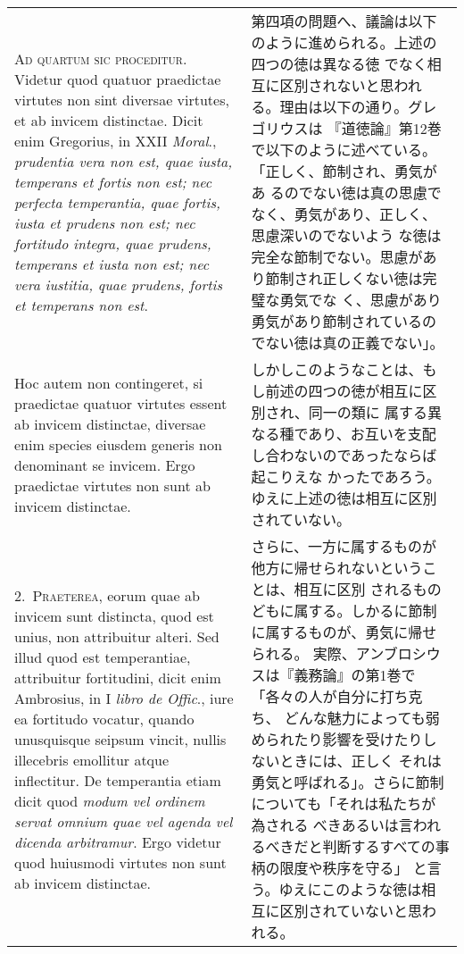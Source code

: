 \documentclass[10pt]{jsarticle}
\begin{document}
\begin{longtable}{p{21em}p{21em}}
{\scshape Ad quartum sic proceditur}. Videtur quod quatuor praedictae
virtutes non sint diversae virtutes, et ab invicem distinctae. Dicit
enim Gregorius, in XXII {\itshape Moral}., {\itshape prudentia vera
non est, quae iusta, temperans et fortis non est; nec perfecta
temperantia, quae fortis, iusta et prudens non est; nec fortitudo
integra, quae prudens, temperans et iusta non est; nec vera iustitia,
quae prudens, fortis et temperans non est}.


&

第四項の問題へ、議論は以下のように進められる。上述の四つの徳は異なる徳
でなく相互に区別されないと思われる。理由は以下の通り。グレゴリウスは
『道徳論』第12巻で以下のように述べている。「正しく、節制され、勇気があ
るのでない徳は真の思慮でなく、勇気があり、正しく、思慮深いのでないよう
な徳は完全な節制でない。思慮があり節制され正しくない徳は完璧な勇気でな
く、思慮があり勇気があり節制されているのでない徳は真の正義でない」。
 
\\


 Hoc autem non contingeret,
si praedictae quatuor virtutes essent ab invicem distinctae, diversae
enim species eiusdem generis non denominant se invicem. Ergo
praedictae virtutes non sunt ab invicem distinctae.


&

しかしこのようなことは、もし前述の四つの徳が相互に区別され、同一の類に
属する異なる種であり、お互いを支配し合わないのであったならば起こりえな
かったであろう。ゆえに上述の徳は相互に区別されていない。
 
\\



2.~{\scshape Praeterea}, eorum quae ab invicem sunt distincta, quod
est unius, non attribuitur alteri. Sed illud quod est temperantiae,
attribuitur fortitudini, dicit enim Ambrosius, in I {\itshape libro de
Offic}., iure ea fortitudo vocatur, quando unusquisque seipsum vincit,
nullis illecebris emollitur atque inflectitur. De temperantia etiam
dicit quod {\itshape modum vel ordinem servat omnium quae vel agenda
vel dicenda arbitramur}. Ergo videtur quod huiusmodi virtutes non sunt
ab invicem distinctae.

&

 さらに、一方に属するものが他方に帰せられないということは、相互に区別
 されるものどもに属する。しかるに節制に属するものが、勇気に帰せられる。
 実際、アンブロシウスは『義務論』の第1巻で「各々の人が自分に打ち克ち、
 どんな魅力によっても弱められたり影響を受けたりしないときには、正しく
 それは勇気と呼ばれる」。さらに節制についても「それは私たちが為される
 べきあるいは言われるべきだと判断するすべての事柄の限度や秩序を守る」
 と言う。ゆえにこのような徳は相互に区別されていないと思われる。
 


\end{longtable}
\end{document}
